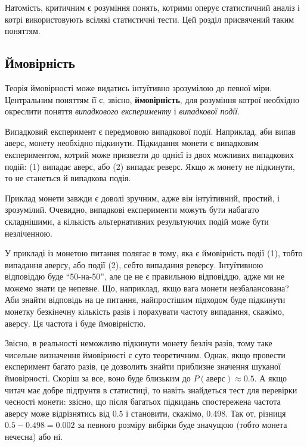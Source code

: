 \documentclass[
  11pt,
]{book}
\begin{document}
Натомість, критичним є розуміння понять, котрими оперує статистичний
аналіз і котрі використовують всілякі статистичні тести. Цей розділ
присвячений таким поняттям.

\subsection{Ймовірність}\label{ux439ux43cux43eux432ux456ux440ux43dux456ux441ux442ux44c}

Теорія ймовірності може видатись інтуїтивно зрозумілою до певної міри.
Центральним поняттям її є, звісно, \textbf{ймовірність}, для розуміння
котрої необхідно окреслити поняття \emph{випадкового експерименту} і
\emph{випадкової події}.

Випадковий експеримент є передмовою випадкової події. Наприклад, аби
випав аверс, монету необхідно підкинути. Підкидання монети є випадковим
експериментом, котрий може призвезти до однієї із двох можливих
випадкових подій: (1) випадає аверс, або (2) випадає реверс. Якщо ж
монету не підкинути, то не станеться й випадкова подія.

Приклад монети завжди є доволі зручним, адже він інтуїтивний, простий, і
зрозумілий. Очевидно, випадкові експерименти можуть бути набагато
складнішими, а кількість альтернативних результуючих подій може бути
незліченною.

У прикладі із монетою питання полягає в тому, яка є ймовірність події
(1), тобто випадання аверсу, або події (2), себто випадання реверсу.
Інтуїтивною відповіддю буде ``50-на-50'', але це не є правильною
відповіддю, адже ми не можемо знати це непевне. Що, наприклад, якщо вага
монети незбалансована? Аби знайти відповідь на це питання, найпростішим
підходом буде підкинути монетку безкінечну кількість разів і порахувати
частоту випадання, скажімо, аверсу. Ця частота і буде ймовірністю.

Звісно, в реальності неможливо підкинути монету безліч разів, тому таке
чисельне визначення ймовірності є суто теоретичним. Однак, якщо провести
експеримент багато разів, це дозволить знайти приблизне значення шуканої
ймовірності. Скоріш за все, воно буде близьким до
\(P(аверс) \approx 0.5\). А якщо читач має добре підґрунтя в статистиці,
то навіть знайдеться тест для перевірки чесності монети: звісно, що
після багатьох підкидань спостережена частота аверсу може відрізнятись
від \(0.5\) і становити, скажімо, \(0.498\). Так от, різниця
\(0.5 - 0.498 = 0.002\) за певного розміру вибірки буде значущою (тобто
монета нечесна) або ні.
\end{document}
